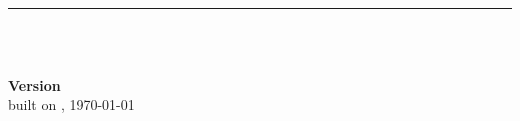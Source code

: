 

\thispagestyle{empty}

\begin{minipage}{\textwidth}
\color{ThemeColor}\flushright
{\Large\textsf{\textbf{\DocTitle}}}\\
\noindent\rule{\textwidth}{2pt}\\[1ex]
\textsf{\textbf{\DocDescription}}
\end{minipage}


\begin{minipage}{\textwidth}
\flushright
\textsf{\DocAuthor}\\[2ex]
\textbf{Version~\DocRevision}\\[0.5ex]
\tiny{built on \currenttime, \today}
\end{minipage}

\begin{flushright}
\end{flushright}

\pagebreak

\thispagestyle{empty}
\pagebreak
